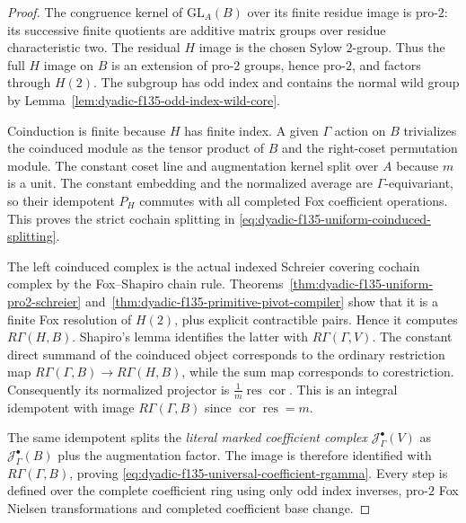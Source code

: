\documentclass[11pt]{article}
\theoremstyle{definition}
\begin{document}
\begin{proof}
The congruence
kernel of
$\mathrm{GL}_A(B)$
over its finite
residue image
is pro-$2$:
its successive
finite quotients
are additive
matrix groups
over residue
characteristic
two.
The residual
$H$ image is
the chosen
Sylow $2$-group.
Thus the full
$H$ image on
$B$ is an
extension of
pro-$2$ groups,
hence pro-$2$,
and factors through
$H(2)$.
The subgroup has
odd index
and contains
the normal wild
group by
Lemma~\ref{lem:dyadic-f135-odd-index-wild-core}.

Coinduction
is finite
because $H$
has finite
index.  A
given $\Gamma$
action on $B$
trivializes the
coinduced module
as the tensor
product of
$B$ and the
right-coset
permutation
module.
The constant
coset line and
augmentation
kernel split
over $A$ because
$m$ is a unit.
The constant
embedding and
the normalized
average are
$\Gamma$-equivariant,
so their idempotent
$P_H$ commutes
with all
completed Fox
coefficient
operations.
This proves
the strict
cochain splitting
in
\eqref{eq:dyadic-f135-uniform-coinduced-splitting}.

The left
coinduced
complex is
the actual
indexed
Schreier covering
cochain complex
by the
Fox--Shapiro
chain rule.
Theorems~\ref{thm:dyadic-f135-uniform-pro2-schreier}
and~\ref{thm:dyadic-f135-primitive-pivot-compiler}
show that it
is a finite
Fox resolution
of $H(2)$,
plus explicit
contractible
pairs.
Hence it
computes
$R\Gamma(H,B)$.
Shapiro's lemma
identifies the
latter with
$R\Gamma(\Gamma,V)$.
The constant
direct summand
of the coinduced
object corresponds
to the ordinary
restriction map
$R\Gamma(\Gamma,B)
\to R\Gamma(H,B)$,
while the
sum map corresponds
to corestriction.
Consequently its
normalized
projector is
$\frac1m
\operatorname{res}
\operatorname{cor}$.
This is an
integral
idempotent with
image
$R\Gamma(\Gamma,B)$
since
$\operatorname{cor}
\operatorname{res}=m$.

The same
idempotent
splits the
\emph{literal
marked coefficient
complex}
$\mathcal J_\Gamma^\bullet(V)$
as
$\mathcal J_\Gamma^\bullet(B)$
plus the augmentation
factor.
The image
is therefore
identified
with
$R\Gamma(\Gamma,B)$,
proving
\eqref{eq:dyadic-f135-universal-coefficient-rgamma}.
Every step is
defined over
the complete
coefficient ring
using only odd
index inverses,
pro-$2$ Fox
Nielsen transformations
and completed
coefficient
base change.
\end{proof}
\end{document}
